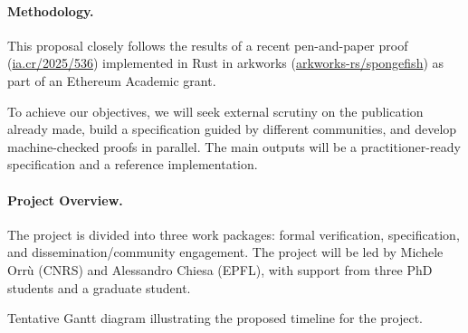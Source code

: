 \documentclass{article}
\begin{document}
\paragraph{Methodology.}
This proposal closely follows the results of a recent pen-and-paper proof (\href{https://eprint.iacr.org/2025/536.pdf}{ia.cr/2025/536}) implemented in Rust in arkworks (\href{https://github.com/arkworks-rs/spongefish}{arkworks-rs/spongefish}) as part of an Ethereum Academic grant.

To achieve our objectives, we will seek external scrutiny on the publication already made, build a specification guided by different communities, and develop machine-checked proofs in parallel. The main outputs will be a practitioner-ready specification and a reference implementation.


\paragraph{Project Overview.}
The project is divided into three work packages: formal verification, specification, and dissemination/community engagement. The project will be led by Michele Orrù (CNRS) and Alessandro Chiesa (EPFL), with support from three PhD students and a graduate student.



\begin{table}[t]
    \def\arraystretch{1.2}%
\centering
\caption{Tentative Gantt diagram illustrating the proposed timeline for the project.}
\end{table}
\end{document}
